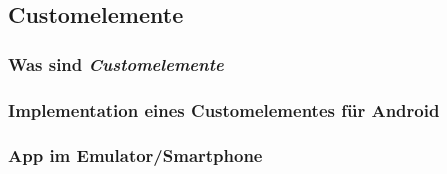 
\subsection{Customelemente}
\subsubsection{Was sind \textit{Customelemente}}
\subsubsection{Implementation eines Customelementes für Android}
\subsubsection{App im Emulator/Smartphone}